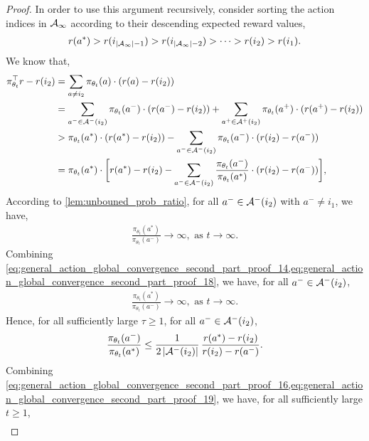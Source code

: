 \begin{proof}
In order to use this argument recursively, consider sorting the action indices in ${\mathcal{A}}_\infty$ according to their descending expected reward values,
\begin{align}
\label{eq:general_action_global_convergence_second_part_proof_15}
    r(a^*) > r(i_{|{\mathcal{A}}_\infty| - 1}) > r(i_{|{\mathcal{A}}_\infty| - 2}) > \cdots > r(i_2) > r(i_1).
\end{align}
We know that, 
\begin{align}
    \pi_{\theta_t}^\top r - r(i_2) &= \sum_{a \neq i_2} \pi_{\theta_t}(a) \cdot (r(a) - r(i_2)) \\
    & = \sum_{a^- \in {\mathcal{A}}^-(i_2)}{ \pi_{\theta_t}(a^-) \cdot (r(a^-) - r(i_2)) } + \sum_{a^+ \in {\mathcal{A}}^+(i_2)}{ \pi_{\theta_t}(a^+) \cdot ( r(a^+) - r(i_2)) }
    \\
    &> \pi_{\theta_t}(a^*) \cdot (r(a^*) - r(i_2) ) - \sum_{a^- \in {\mathcal{A}}^-(i_2)}{ \pi_{\theta_t}(a^-) \cdot ( r(i_2) - r(a^-)) } \\
    &= \pi_{\theta_t}(a^*) \cdot \bigg[ r(a^*) - r(i_2) - \sum_{a^- \in {\mathcal{A}}^-(i_2)}{ \frac{ \pi_{\theta_t}(a^-)}{ \pi_{\theta_t}(a^*) } \cdot ( r(i_2) - r(a^-)) } \bigg], \label{eq:general_action_global_convergence_second_part_proof_16}
\end{align}
According to \cref{lem:unbouned_prob_ratio}, for all $a^- \in {\mathcal{A}}^-(i_2)$ with $a^- \ne i_1$, we have, 
\begin{align}
\label{eq:general_action_global_convergence_second_part_proof_18}
    \frac{ \pi_{\theta_t}(a^*) }{ \pi_{\theta_t}(a^-)} \to \infty, \text{ as } t \to \infty.
\end{align}
Combining \cref{eq:general_action_global_convergence_second_part_proof_14,eq:general_action_global_convergence_second_part_proof_18}, we have, for all $a^- \in {\mathcal{A}}^-(i_2)$, 
\begin{align}
    \frac{ \pi_{\theta_t}(a^*) }{ \pi_{\theta_t}(a^-)} \to \infty, \text{ as } t \to \infty.
\end{align}
Hence, for all sufficiently large $\tau \ge 1$, for all $a^- \in {\mathcal{A}}^{-}(i_2)$, 
\begin{align}
\frac{ \pi_{\theta_t}(a^-) }{ \pi_{\theta_t}(a^*)} \leq \frac{1}{2 \, |{\mathcal{A}}^{-}(i_2)|} \, \frac{r(a^*) - r(i_2)}{r(i_2) - r(a^-)}.
\label{eq:general_action_global_convergence_second_part_proof_19}
\end{align}
Combining \cref{eq:general_action_global_convergence_second_part_proof_16,eq:general_action_global_convergence_second_part_proof_19}, we have, for all sufficiently large $t \ge 1$,
\begin{align}

\end{align}
\end{proof}

